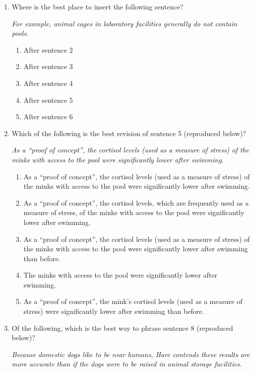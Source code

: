 \begin{enumerate}

\item Where is the best place to insert the following sentence?

\textit{For example, animal cages in laboratory facilities generally do not contain pools.}

\begin{enumerate}[label=(\Alph*)]
\item After sentence 2
\item After sentence 3
\item After sentence 4
\item After sentence 5
\item After sentence 6
\end{enumerate}

\item{Which of the following is the best revision of sentence 5 (reproduced below)?}

\textit{As a ``proof of concept'', the cortisol levels (used as a measure of stress) of the minks with access to the pool were significantly lower after swimming.}

\begin{enumerate}[label=(\Alph*)]
\item As a ``proof of concept'', the cortisol levels (used as a measure of stress) of the minks with access to the pool were significantly lower after swimming.
\item As a ``proof of concept'', the cortisol levels, which are frequently used as a measure of stress, of the minks with access to the pool were significantly lower after swimming.
\item As a ``proof of concept'', the cortisol levels (used as a measure of stress) of the minks with access to the pool were significantly lower after swimming than before.
\item The minks with access to the pool were significantly lower after swimming. 
\item As a ``proof of concept'', the mink's cortisol levels (used as a measure of stress) were significantly lower after swimming than before. 
\end{enumerate}

\item Of the following, which is the best way to phrase sentence 8 (reproduced below)?

\textit{Because domestic dogs like to be near humans, Hare contends these results are more accurate than if the dogs were to be raised in animal storage facilities.}


\end{enumerate}
